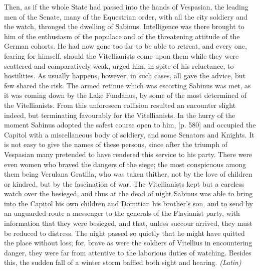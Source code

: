 Then, as if the whole State had passed into the hands of Vespasian, the leading men of the Senate, many of the Equestrian order, with all the city soldiery and the watch, thronged the dwelling of Sabinus. Intelligence was there brought to him of the enthusiasm of the populace and of the threatening attitude of the German cohorts. He had now gone too far to be able to retreat, and every one, fearing for himself, should the Vitellianists come upon them while they were scattered and comparatively weak, urged him, in spite of his reluctance, to hostilities. As usually happens, however, in such cases, all gave the advice, but few shared the risk. The armed retinue which was escorting Sabinus was met, as it was coming down by the Lake Fundanus, by some of the most determined of the Vitellianists. From this unforeseen collision resulted an encounter slight indeed, but terminating favourably for the Vitellianists. In the hurry of the moment Sabinus adopted the safest course open to him, [p. 580] and occupied the Capitol with a miscellaneous body of soldiery, and some Senators and Knights. It is not easy to give the names of these persons, since after the triumph of Vespasian many pretended to have rendered this service to his party. There were even women who braved the dangers of the siege; the most conspicuous among them being Verulana Gratilla, who was taken thither, not by the love of children or kindred, but by the fascination of war. The Vitellianists kept but a careless watch over the besieged, and thus at the dead of night Sabinus was able to bring into the Capitol his own children and Domitian his brother's son, and to send by an unguarded route a messenger to the generals of the Flavianist party, with information that they were besieged, and that, unless succour arrived, they must be reduced to distress. The night passed so quietly that he might have quitted the place without loss; for, brave as were the soldiers of Vitellius in encountering danger, they were far from attentive to the laborious duties of watching. Besides this, the sudden fall of a winter storm baffled both sight and hearing. \emph{(Latin)}


